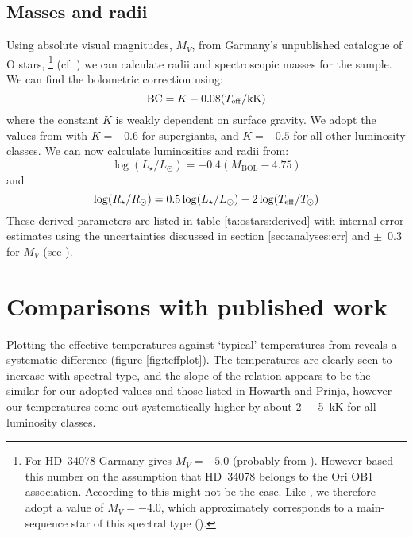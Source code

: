 \subsection{Masses and radii}

Using absolute visual magnitudes, $M_V$, from Garmany's unpublished
catalogue of O stars,%
\footnote{For HD~34078 Garmany gives $M_V = -5.0$ (probably from
\cite{hu:78}). However  based this number on the
assumption that HD~34078 belongs to the Ori OB1 association. According
to  this might not be the case. Like
, we therefore adopt a value of $M_V = -4.0$, which approximately
corresponds to a main-sequence star of this spectral type
(\cite{co:83}).}
%
(cf. \cite{ga:imf}) we can calculate radii and spectroscopic masses
for the sample. We can find the bolometric correction using:
%
\begin{equation}
\mathrm{BC} = K - 0.08(T_{\mathrm{eff}}/\mathrm{kK})
\end{equation}
%
where the constant $K$ is weakly dependent on surface gravity. We
adopt the values from  with $K = -0.6$ for supergiants,
and $K = -0.5$ for all other luminosity classes. We can now calculate
luminosities and radii from:
%
\begin{equation}
\log(L_\star / L_\odot) = -0.4 (M_\mathrm{BOL} - 4.75)
\end{equation}
%
and
%
\begin{equation}
\log(R_\star / R_\odot) = 0.5 \log(L_\star / L_\odot) - 2 \log(T_{\mathrm{eff}}/T_\odot) 
\end{equation}
%
These derived parameters are listed in table \ref{ta:ostars:derived}
with internal error estimates using the uncertainties discussed in
section \ref{sec:analyses:err} and $\pm$~0.3 for $M_V$ (see \cite{he:92}).


\section{Comparisons with published work}
\label{sec:comp}

Plotting the effective temperatures against `typical' temperatures
from  reveals a systematic difference (figure
\ref{fig:teffplot}). The temperatures are clearly seen to increase
with spectral type, and the slope of the relation appears to be the
similar for our adopted values and those listed in Howarth and Prinja,
however our temperatures come out systematically higher by about
2~--~5~kK for all luminosity classes.

